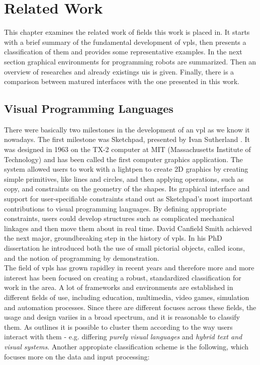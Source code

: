\chapter{Related Work}
This chapter examines the related work of fields this work is placed in. It starts with a brief summary of the fundamental development of \glspl{vpl}, then presents a classification of them and provides some representative examples. In the next section graphical environments for programming robots are summarized. Then an overview of researches and already existings \glspl{ui} is given. Finally, there is a comparison between matured interfaces with the one presented in this work.

\section{Visual Programming Languages}
There were basically two milestones in the development of an \gls{vpl} as we know it nowadays. The first milestone was Sketchpad, presented by Ivan Sutherland \cite{Sutherland:1963}. It was designed in 1963 on the TX-2 computer at MIT (Massachusetts Institute of Technology) and has been called the first computer graphics application. The system allowed users to work with a lightpen to create 2D graphics by creating simple primitives, like lines and circles, and then applying operations, such as copy, and constraints on the geometry of the shapes. Its graphical interface and support for user-specifiable constraints stand out as Sketchpad's most important contributions to visual programming languages. By defining appropriate constraints, users could develop structures such as complicated mechanical linkages and then move them about in real time.\cite{Boshernitsan:CSD-04-1368} David Canfield Smith achieved the next major, groundbreaking step in the history of \glspl{vpl}. In his PhD dissertation \cite{Smith:1975:PCP:907074} he introduced both the use of small pictorial objects, called icons, and the notion of programming by demonstration. \\

The field of \glspl{vpl} has grown rapidley in recent years and therefore more and more interest has been focused on creating a robust, standardized classification for work in the area. A lot of frameworks and environments are established in different fields of use, including education, multimedia, video games, simulation and automation processes. Since there are different focuses across these fields, the usage and design variies in a broad spectrum, and it is reasonable to classify them. As \cite{Boshernitsan:CSD-04-1368} outlines it is possible to cluster them according to the way users interact with them - e.g. differing \textit{purely visual languages} and \textit{hybrid text and visual systems}. Another appropiate classification scheme is the following, which focuses more on the data and input processing:

